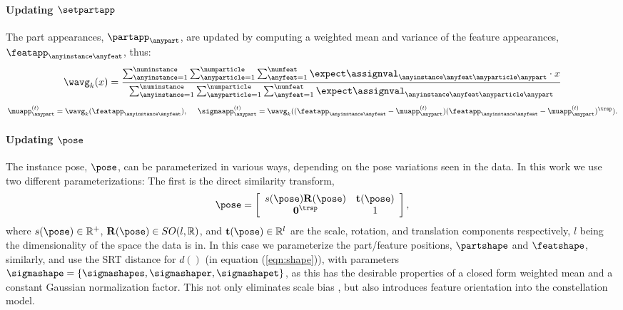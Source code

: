 \paragraph{Updating $\setpartapp$}
The part appearances, $\partapp_\anypart$, are updated by computing a weighted mean and variance of the feature appearances, $\featapp_{\anyinstance\anyfeat}$, thus:
\begin{equation}
\wavg_k(x) = \frac{\sum_{\anyinstance=1}^\numinstance \sum_{\anyparticle = 1}^{\numparticle} \sum_{\anyfeat=1}^{\numfeat}\expect\assignval_{\anyinstance\anyfeat\anyparticle\anypart} \cdot x}{\sum_{\anyinstance=1}^\numinstance \sum_{\anyparticle = 1}^{\numparticle} \sum_{\anyfeat=1}^{\numfeat}\expect\assignval_{\anyinstance\anyfeat\anyparticle\anypart}}
\label{eq:weightedavg}
\end{equation}\vspace{-2mm}
\begin{equation}
\muapp_{\anypart}^{(t)} = \wavg_k(\featapp_{\anyinstance\anyfeat}), ~~~~ 
\sigmaapp_{\anypart}^{(t)} = \wavg_k((\featapp_{\anyinstance\anyfeat} - \muapp_{\anypart}^{(t)})(\featapp_{\anyinstance\anyfeat} - \muapp_{\anypart}^{(t)})^\trsp).
\label{eq:updatepartapp}
\end{equation}

\paragraph{Updating $\pose$}
The instance pose, $\pose$, can be parameterized in various ways, depending on the pose variations seen in the data. In this work we use two different parameterizations: The first is the direct similarity transform, 
\begin{equation}
\pose=\left[\begin{array}{cc}
s(\pose)\mathbf{R}(\pose) & \mathbf{t}(\pose)\\
\mathbf{0}^\trsp & 1\end{array}\right],
\label{eq:dsmatrix}
\end{equation}
where $s(\pose)\in\mathbb{R}^+$, $\mathbf{R}(\pose)\in SO(l,\mathbb{R})$, and $\mathbf{t}(\pose)\in\mathbb{R}^l$ are the scale, rotation, and translation components respectively, $l$ being the dimensionality of the space the data is in. In this case we parameterize the part/feature positions, $\partshape$ and $\featshape$, similarly, and use the SRT distance \cite{Pham2011} for $d()$ (in equation (\ref{eqn:shape})), with parameters $\sigmashape = \{\sigmashapes, \sigmashaper, \sigmashapet\}$, as this has the desirable properties of a closed form weighted mean and a constant Gaussian normalization factor. This not only eliminates scale bias \cite{Pham2011}, but also introduces feature orientation into the constellation model.

